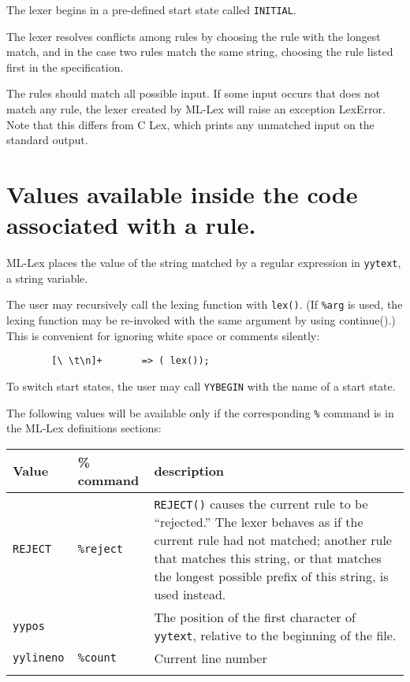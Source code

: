 The lexer begins in a pre-defined start state called \verb|INITIAL|.

The lexer resolves conflicts among rules by choosing the rule with
the longest match, and in the case two rules match the same string,
choosing the rule listed first in the specification.

The rules should match all possible input.  If some input occurs that
does not match any rule, the lexer created by ML-Lex will raise an
exception LexError.  Note that this differs from C Lex, which prints
any unmatched input on the standard output.

\section{Values available inside the code associated with a rule.}
\label{avail}

ML-Lex places the value of the string matched by a regular expression
in \verb|yytext|, a string variable.  

The user may recursively
call the lexing function with \verb|lex()|.  (If \verb|%arg| is used, the
lexing function may be re-invoked with the same argument by using
continue().) This is convenient for ignoring white space or comments silently:

\begin{verbatim}
        [\ \t\n]+       => ( lex());
\end{verbatim}

To switch start states, the user may call \verb|YYBEGIN| with the name of a
start state.

The following values will be available only if the corresponding \verb|%|
command is in the ML-Lex definitions sections:

\begin{tabular}{lll}
\\
{\bf Value}&{\bf \% command}&{\bf description}\\
\hline
{\tt REJECT} &{\tt\%reject}&\parbox[t]{2.6in}{{\tt REJECT()} causes the current
					rule to be ``rejected.''
					The lexer behaves as if the
					current rule had not matched;
					another rule that matches this
					string, or that matches the longest
					possible prefix of this string,
					is used instead.} \\
{\tt yypos} & & \parbox[t]{2.6in}{The position of the first character
of {\tt yytext}, relative to the beginning of the file.}\\
{\tt yylineno } & {\tt \%count} &         Current line number\\
\\
\end{tabular}
        

